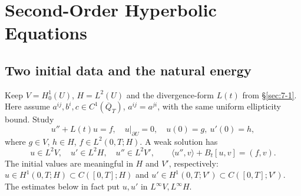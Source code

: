 \Needspace{55mm}
\section{Second-Order Hyperbolic Equations}
\label{sec:7-2}
\Needspace{55mm}
\subsection{Two initial data and the natural energy}
Keep $V=H^1_0(U)$, $H=L^2(U)$ and the divergence-form $L(t)$ from
\S\ref{sec:7-1}. Here assume $a^{ij},b^i,c\in C^1(\overline Q_T)$,
$a^{ij}=a^{ji}$, with the same uniform ellipticity bound. Study
\begin{equation}\label{eq:7-wave}
 u''+L(t)u=f,\quad u|_{\partial U}=0,\quad u(0)=g,\ u'(0)=h,
\end{equation}
where $g\in V$, $h\in H$, $f\in L^2(0,T;H)$.
A weak solution has
\[
 u\in L^2V,\quad u'\in L^2H,\quad u''\in L^2V',\qquad
 \langle u'',v\rangle+B_t[u,v]=(f,v).
\]
The initial values are meaningful in $H$ and $V'$, respectively:
$u\in H^1(0,T;H)\subset C([0,T];H)$ and
$u'\in H^1(0,T;V')\subset C([0,T];V')$.
The estimates below in fact put $u,u'$ in $L^\infty V,L^\infty H$.
\Needspace{55mm}


